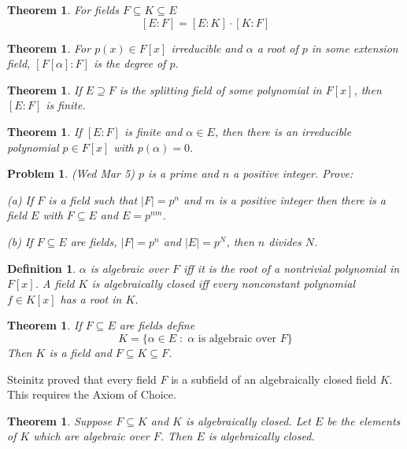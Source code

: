 \documentclass[12pt]{article}
\def\al{\alpha}
\def\al{\alpha}
\def\su{\subseteq}
\def\st{\;:\;}
\newtheorem{thm}[theorem]{Theorem}
\newtheorem{define}[theorem]{Definition}
\newtheorem{prob}{Problem}
\begin{document}
\begin{thm}
For fields $F\su K\su E$
$$[E:F]=[E:K]\cdot [K:F]$$
\end{thm}

\begin{thm}
For $p(x)\in F[x]$ irreducible and $\al$ a root of $p$ in
some extension field, $[F[\al]:F]$ is the degree of $p$.
\end{thm}

\begin{thm}
If $E\supseteq F$ is the splitting field of some polynomial in $F[x]$,
then $[E:F]$ is finite.
\end{thm}

\begin{thm}
If $[E:F]$ is finite and $\al\in E$, then there is an irreducible
polynomial $p\in F[x]$ with $p(\al)=0$.
\end{thm}

\begin{prob}
(Wed Mar 5) $p$ is a prime and $n$ a positive integer.
Prove:
\par (a) If $F$ is a field such that $|F|=p^n$ and $m$ is a
positive integer then there is a field $E$ with $F\su E$
and $E=p^{nm}$.
\par (b) If $F\su E$ are fields, $|F|=p^n$
and $|E|=p^N$, then $n$ divides $N$.
\end{prob}

\begin{define}
$\al$ is algebraic over $F$ iff it is the root of a nontrivial polynomial
in $F[x]$.  A field $K$ is algebraically closed iff every nonconstant 
polynomial $f\in K[x]$ has a root in $K$.
\end{define}

\begin{thm}
If $F\su E$ are fields define
$$K=\{\al\in E\st \al \mbox{ is algebraic over } F\}$$
Then $K$ is a field and $F\su K\su F$.
\end{thm}

Steinitz proved that every field $F$ is a subfield of an algebraically
closed field $K$.  This requires the Axiom of Choice.

\begin{thm}
Suppose $F\su K$ and $K$ is algebraically closed.  Let
$E$ be the elements of $K$ which are algebraic over $F$.  Then
$E$ is algebraically closed.
\end{thm}
\end{document}
